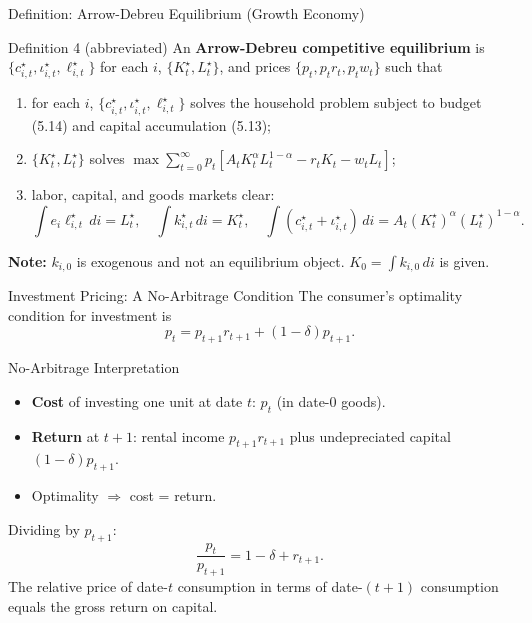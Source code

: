 \documentclass[aspectratio=169,10pt]{beamer}
\newcommand{\apxbutton}[1]{\hfill\hyperlink{#1}{\beamerbutton{Appendix}}}
\begin{document}
\begin{frame}{Definition: Arrow-Debreu Equilibrium (Growth Economy)}
\begin{block}{Definition 4 (abbreviated)}
An \textbf{Arrow-Debreu competitive equilibrium} is $\{c_{i,t}^\star, \iota_{i,t}^\star, \ell_{i,t}^\star\}$ for each $i$, $\{K_t^\star, L_t^\star\}$, and prices $\{p_t, p_t r_t, p_t w_t\}$ such that
\begin{enumerate}
  \item for each $i$, $\{c_{i,t}^\star, \iota_{i,t}^\star, \ell_{i,t}^\star\}$ solves the household problem subject to budget (5.14) and capital accumulation (5.13);
  \item $\{K_t^\star, L_t^\star\}$ solves $\displaystyle\max \sum_{t=0}^{\infty} p_t\left[A_t K_t^\alpha L_t^{1-\alpha} - r_t K_t - w_t L_t\right]$;
  \item labor, capital, and goods markets clear:
  \[
  \textstyle\int e_i\ell_{i,t}^\star\,di = L_t^\star, \quad \int k_{i,t}^\star\,di = K_t^\star, \quad \int(c_{i,t}^\star+\iota_{i,t}^\star)\,di = A_t (K_t^\star)^\alpha (L_t^\star)^{1-\alpha}.
  \]
\end{enumerate}
\end{block}

\medskip
\textbf{Note:} $k_{i,0}$ is exogenous and not an equilibrium object. $K_0=\int k_{i,0}\,di$ is given.
\end{frame}

\begin{frame}{Investment Pricing: A No-Arbitrage Condition}
\hypertarget{m-a3}{}
The consumer's optimality condition for investment is
\[
\boxed{p_t=p_{t+1}r_{t+1}+(1-\delta)p_{t+1}.}
\tag{5.17}
\]

\begin{block}{No-Arbitrage Interpretation}
\begin{itemize}
  \item \textbf{Cost} of investing one unit at date $t$: $p_t$ (in date-0 goods).
  \item \textbf{Return} at $t+1$: rental income $p_{t+1}r_{t+1}$ plus undepreciated capital $(1-\delta)p_{t+1}$.
  \item Optimality $\Rightarrow$ cost = return.
\end{itemize}
\end{block}

Dividing by $p_{t+1}$:
\[
\frac{p_t}{p_{t+1}} = 1-\delta+r_{t+1}.
\]
The relative price of date-$t$ consumption in terms of date-$(t+1)$ consumption equals the gross return on capital.
\apxbutton{a3}
\end{frame}
\end{document}
